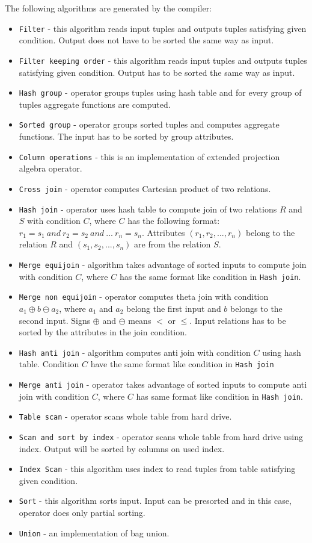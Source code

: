 The following algorithms are generated by the compiler:
\begin{itemize}
\item \texttt{Filter} - this algorithm reads input tuples and outputs tuples satisfying given condition. Output does not have to be sorted the same way as input.
\item \texttt{Filter~keeping~order} - this algorithm reads input tuples and outputs tuples satisfying given condition. Output has to be sorted the same way as input.
\item \texttt{Hash~group} - operator groups tuples using hash table and for every group of tuples aggregate functions are computed.
\item \texttt{Sorted~group} - operator groups sorted tuples and computes aggregate functions. The input has to be sorted by group attributes.
\item \texttt{Column~operations} - this is an implementation of extended projection algebra operator. 
\item \texttt{Cross~join} - operator computes Cartesian product of two relations.
\item \texttt{Hash~join} - operator uses hash table to compute join of two relations $R$ and $S$ with condition $C$, where $C$ has the following format: $r_1=s_1~and~r_2=s_2~and~...~r_n=s_n$. Attributes $(r_1,r_2,...,r_n)$ belong to the relation $R$ and $(s_1,s_2,...,s_n)$ are from the relation $S$.
\item \texttt{Merge~equijoin} - algorithm takes advantage of sorted inputs to compute join with condition $C$, where $C$ has the same format like condition in \texttt{Hash~join}. 
\item \texttt{Merge~non~equijoin} - operator computes theta join with condition $a_1\oplus b \ominus a_2$, where $a_1$ and $a_2$ belong the first input and $b$ belongs to the second input. Signs $\oplus$ and $\ominus$ means $<$ or $\leq$. Input relations has to be sorted by the attributes in the join condition.
\item \texttt{Hash~anti~join} -  algorithm computes anti join with condition $C$  using hash table. Condition $C$ have the same format like condition in \texttt{Hash~join}
\item \texttt{Merge~anti~join} - operator takes advantage of sorted inputs to compute anti join with condition $C$, where $C$ has same format like condition in \texttt{Hash~join}. 
\item \texttt{Table~scan} - operator scans whole table from hard drive.
\item \texttt{Scan~and~sort~by~index} - operator scans whole table from hard drive using index. Output will be sorted by columns on used index.
\item \texttt{Index~Scan} - this algorithm uses index to read tuples from table satisfying given condition.
\item \texttt{Sort} - this algorithm sorts input. Input can be presorted and in this case, operator does only partial sorting.
\item \texttt{Union} - an implementation of bag union.

\end{itemize}


